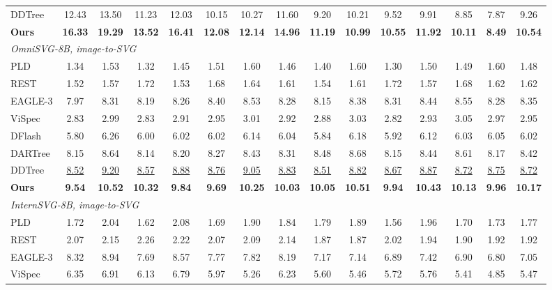 \begin{table}[t]
\begin{tabular*}{\textwidth}{@{\extracolsep{\fill}}l*{14}{c}@{}}
DDTree & 12.43 & 13.50 & 11.23 & 12.03 & 10.15 & 10.27 & 11.60 & 9.20 & 10.21 & 9.52 & 9.91 & 8.85 & 7.87 & 9.26 \\
\textbf{Ours} & \textbf{16.33} & \textbf{19.29} & \textbf{13.52} & \textbf{16.41} & \textbf{12.08} & \textbf{12.14} & \textbf{14.96} & \textbf{11.19} & \textbf{10.99} & \textbf{10.55} & \textbf{11.92} & \textbf{10.11} & \textbf{8.49} & \textbf{10.54} \\
\midrule
\multicolumn{15}{l}{\textit{OmniSVG-8B, image-to-SVG}} \\
PLD & 1.34 & 1.53 & 1.32 & 1.45 & 1.51 & 1.60 & 1.46 & 1.40 & 1.60 & 1.30 & 1.50 & 1.49 & 1.60 & 1.48 \\
REST & 1.52 & 1.57 & 1.72 & 1.53 & 1.68 & 1.64 & 1.61 & 1.54 & 1.61 & 1.72 & 1.57 & 1.68 & 1.62 & 1.62 \\
EAGLE-3 & 7.97 & 8.31 & 8.19 & 8.26 & 8.40 & 8.53 & 8.28 & 8.15 & 8.38 & 8.31 & 8.44 & 8.55 & 8.28 & 8.35 \\
ViSpec & 2.83 & 2.99 & 2.83 & 2.91 & 2.95 & 3.01 & 2.92 & 2.88 & 3.03 & 2.82 & 2.93 & 3.05 & 2.97 & 2.95 \\
DFlash & 5.80 & 6.26 & 6.00 & 6.02 & 6.02 & 6.14 & 6.04 & 5.84 & 6.18 & 5.92 & 6.12 & 6.03 & 6.05 & 6.02 \\
DARTree & 8.15 & 8.64 & 8.14 & 8.20 & 8.27 & 8.43 & 8.31 & 8.48 & 8.68 & 8.15 & 8.44 & 8.61 & 8.17 & 8.42 \\
DDTree & \underline{8.52} & \underline{9.20} & \underline{8.57} & \underline{8.88} & \underline{8.76} & \underline{9.05} & \underline{8.83} & \underline{8.51} & \underline{8.82} & \underline{8.67} & \underline{8.87} & \underline{8.72} & \underline{8.75} & \underline{8.72} \\
\textbf{Ours} & \textbf{9.54} & \textbf{10.52} & \textbf{10.32} & \textbf{9.84} & \textbf{9.69} & \textbf{10.25} & \textbf{10.03} & \textbf{10.05} & \textbf{10.51} & \textbf{9.94} & \textbf{10.43} & \textbf{10.13} & \textbf{9.96} & \textbf{10.17} \\
\midrule
\multicolumn{15}{l}{\textit{InternSVG-8B, image-to-SVG}} \\
PLD & 1.72 & 2.04 & 1.62 & 2.08 & 1.69 & 1.90 & 1.84 & 1.79 & 1.89 & 1.56 & 1.96 & 1.70 & 1.73 & 1.77 \\
REST & 2.07 & 2.15 & 2.26 & 2.22 & 2.07 & 2.09 & 2.14 & 1.87 & 1.87 & 2.02 & 1.94 & 1.90 & 1.92 & 1.92 \\
EAGLE-3 & 8.32 & 8.94 & 7.69 & 8.57 & 7.77 & 7.82 & 8.19 & 7.17 & 7.14 & 6.89 & 7.42 & 6.90 & 6.80 & 7.05 \\
ViSpec & 6.35 & 6.91 & 6.13 & 6.79 & 5.97 & 5.26 & 6.23 & 5.60 & 5.46 & 5.72 & 5.76 & 5.41 & 4.85 & 5.47 \\

\end{tabular*}
\end{table}

